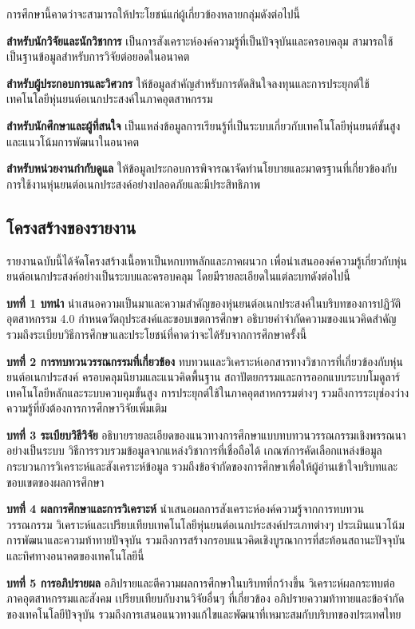 \documentclass[a4paper]{article}
\begin{document}
การศึกษานี้คาดว่าจะสามารถให้ประโยชน์แก่ผู้เกี่ยวข้องหลายกลุ่มดังต่อไปนี้

\textbf{สำหรับนักวิจัยและนักวิชาการ} เป็นการสังเคราะห์องค์ความรู้ที่เป็นปัจจุบันและครอบคลุม สามารถใช้เป็นฐานข้อมูลสำหรับการวิจัยต่อยอดในอนาคต

\textbf{สำหรับผู้ประกอบการและวิศวกร} ให้ข้อมูลสำคัญสำหรับการตัดสินใจลงทุนและการประยุกต์ใช้เทคโนโลยีหุ่นยนต์อเนกประสงค์ในภาคอุตสาหกรรม

\textbf{สำหรับนักศึกษาและผู้ที่สนใจ} เป็นแหล่งข้อมูลการเรียนรู้ที่เป็นระบบเกี่ยวกับเทคโนโลยีหุ่นยนต์ขั้นสูงและแนวโน้มการพัฒนาในอนาคต

\textbf{สำหรับหน่วยงานกำกับดูแล} ให้ข้อมูลประกอบการพิจารณาจัดทำนโยบายและมาตรฐานที่เกี่ยวข้องกับการใช้งานหุ่นยนต์อเนกประสงค์อย่างปลอดภัยและมีประสิทธิภาพ

\subsection{โครงสร้างของรายงาน}

รายงานฉบับนี้ได้จัดโครงสร้างเนื้อหาเป็นหกบทหลักและภาคผนวก เพื่อนำเสนอองค์ความรู้เกี่ยวกับหุ่นยนต์อเนกประสงค์อย่างเป็นระบบและครอบคลุม โดยมีรายละเอียดในแต่ละบทดังต่อไปนี้

\textbf{บทที่ 1 บทนำ} นำเสนอความเป็นมาและความสำคัญของหุ่นยนต์อเนกประสงค์ในบริบทของการปฏิวัติอุตสาหกรรม 4.0 กำหนดวัตถุประสงค์และขอบเขตการศึกษา อธิบายคำจำกัดความของแนวคิดสำคัญ รวมถึงระเบียบวิธีการศึกษาและประโยชน์ที่คาดว่าจะได้รับจากการศึกษาครั้งนี้

\textbf{บทที่ 2 การทบทวนวรรณกรรมที่เกี่ยวข้อง} ทบทวนและวิเคราะห์เอกสารทางวิชาการที่เกี่ยวข้องกับหุ่นยนต์อเนกประสงค์ ครอบคลุมนิยามและแนวคิดพื้นฐาน สถาปัตยกรรมและการออกแบบระบบโมดูลาร์ เทคโนโลยีหลักและระบบควบคุมขั้นสูง การประยุกต์ใช้ในภาคอุตสาหกรรมต่างๆ รวมถึงการระบุช่องว่างความรู้ที่ยังต้องการการศึกษาวิจัยเพิ่มเติม

\textbf{บทที่ 3 ระเบียบวิธีวิจัย} อธิบายรายละเอียดของแนวทางการศึกษาแบบทบทวนวรรณกรรมเชิงพรรณนาอย่างเป็นระบบ วิธีการรวบรวมข้อมูลจากแหล่งวิชาการที่เชื่อถือได้ เกณฑ์การคัดเลือกแหล่งข้อมูล กระบวนการวิเคราะห์และสังเคราะห์ข้อมูล รวมถึงข้อจำกัดของการศึกษาเพื่อให้ผู้อ่านเข้าใจบริบทและขอบเขตของผลการศึกษา

\textbf{บทที่ 4 ผลการศึกษาและการวิเคราะห์} นำเสนอผลการสังเคราะห์องค์ความรู้จากการทบทวนวรรณกรรม วิเคราะห์และเปรียบเทียบเทคโนโลยีหุ่นยนต์อเนกประสงค์ประเภทต่างๆ ประเมินแนวโน้มการพัฒนาและความท้าทายปัจจุบัน รวมถึงการสร้างกรอบแนวคิดเชิงบูรณาการที่สะท้อนสถานะปัจจุบันและทิศทางอนาคตของเทคโนโลยีนี้

\textbf{บทที่ 5 การอภิปรายผล} อภิปรายและตีความผลการศึกษาในบริบทที่กว้างขึ้น วิเคราะห์ผลกระทบต่อภาคอุตสาหกรรมและสังคม เปรียบเทียบกับงานวิจัยอื่นๆ ที่เกี่ยวข้อง อภิปรายความท้าทายและข้อจำกัดของเทคโนโลยีปัจจุบัน รวมถึงการเสนอแนวทางแก้ไขและพัฒนาที่เหมาะสมกับบริบทของประเทศไทย
\end{document}
